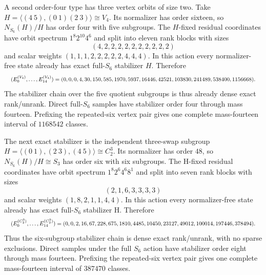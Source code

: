 \documentclass{article}
\newcommand{\fitmath}[1]{\resizebox{0.99\linewidth}{!}{$\displaystyle #1$}}
\begin{document}
A second order-four type has three vertex orbits of size two. Take
$H=\langle(4\ 5),(0\ 1)(2\ 3)\rangle\cong V_4$. Its normalizer has order
sixteen, so $N_{S_6}(H)/H$ has order four with five subgroups. The $H$-fixed
residual coordinates have orbit spectrum $1^8 2^{10}4^6$ and split into eleven
rank blocks with sizes
\[
  (4,2,2,2,2,2,2,2,2,2,2)
\]
and scalar weights $(1,1,1,2,2,2,2,2,4,4,4)$. In this action every
normalizer-free state already has exact full-$S_6$ stabilizer $H$. Therefore
\begin{equation}
  \fitmath{%
    (E_0^{(V_4)},\ldots,E_{14}^{(V_4)})=
    (0,0,0,4,30,150,585,1970,5937,16446,42521,103830,241489,
     538400,1156668).
  }
  \label{eq:optimization-crazy-sextuple-s6-full-three-pair-v4-ranking}
\end{equation}
The stabilizer chain over the five quotient subgroups is thus already dense
exact rank/unrank. Direct full-$S_6$ samples have stabilizer order four through
mass fourteen. Prefixing the repeated-six vertex pair gives one complete
mass-fourteen interval of $1168542$ classes.

The next exact stabilizer is the independent three-swap subgroup
$H=\langle(0\ 1),(2\ 3),(4\ 5)\rangle\cong C_2^3$. Its normalizer has order
$48$, so $N_{S_6}(H)/H\cong S_3$ has order six with six subgroups. The H-fixed
residual coordinates have orbit spectrum $1^8 2^6 4^6 8^1$ and split into
seven rank blocks with sizes
\[
  (2,1,6,3,3,3,3)
\]
and scalar weights $(1,8,2,1,1,4,4)$. In this action every normalizer-free
state already has exact full-$S_6$ stabilizer H. Therefore
\begin{equation}
  \fitmath{%
    (E_0^{(C_2^3)},\ldots,E_{14}^{(C_2^3)})=
    (0,0,2,16,67,228,675,1810,4485,10450,23127,49012,100014,
     197446,378494).
  }
  \label{eq:optimization-crazy-sextuple-s6-full-c2-cubed-ranking}
\end{equation}
Thus the six-subgroup stabilizer chain is dense exact rank/unrank, with no
sparse exclusions. Direct samples under the full $S_6$ action have stabilizer
order eight through mass fourteen. Prefixing the repeated-six vertex pair gives
one complete mass-fourteen interval of $387470$ classes.
\end{document}
